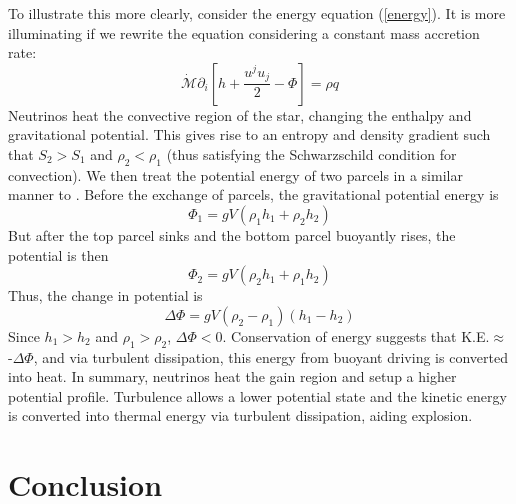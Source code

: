 \documentclass[twocolumn]{aastex6}
\begin{document}
To illustrate this more clearly, consider the energy equation (\ref{energy}).  It is
more illuminating if we rewrite the equation considering a constant
mass accretion rate:
\begin{equation}
\dot{\mathcal{M}}\partial_i \left [h + \frac{u^j u_j}{2} - \Phi \right ] =  \rho q
\end{equation} 
Neutrinos heat the convective region of the star, changing the enthalpy and gravitational potential. This gives rise to an entropy and density gradient such that $S_2 > S_1$ and $\rho_2 < \rho_1$ (thus satisfying the Schwarzschild condition for convection). We then treat the potential energy of two parcels in a similar manner to \citet{burrows95}. Before the exchange of parcels, the gravitational potential energy is
\begin{equation}
  \Phi_1 = gV(\rho_1 h_1 + \rho_2 h_2)
\end{equation}
But after the top parcel sinks and the bottom parcel buoyantly rises, the potential is then
\begin{equation}
  \Phi_2 = gV(\rho_2 h_1 + \rho_1 h_2)
\end{equation}
Thus, the change in potential is
\begin{equation}
  \Delta \Phi = gV(\rho_2 - \rho_1)(h_1 - h_2)
\end{equation}
Since $h_1 > h_2$ and $\rho_1 > \rho_2$, $\Delta \Phi < 0$.
Conservation of energy suggests that K.E.$\approx$-$\Delta \Phi$, and via turbulent dissipation, this
energy from buoyant driving is converted into heat. In summary, neutrinos heat the gain region and setup a higher potential profile. Turbulence allows a lower potential state and the kinetic energy is converted into thermal energy via turbulent dissipation, aiding explosion.

\section{Conclusion}
\label{section4}
\end{document}
